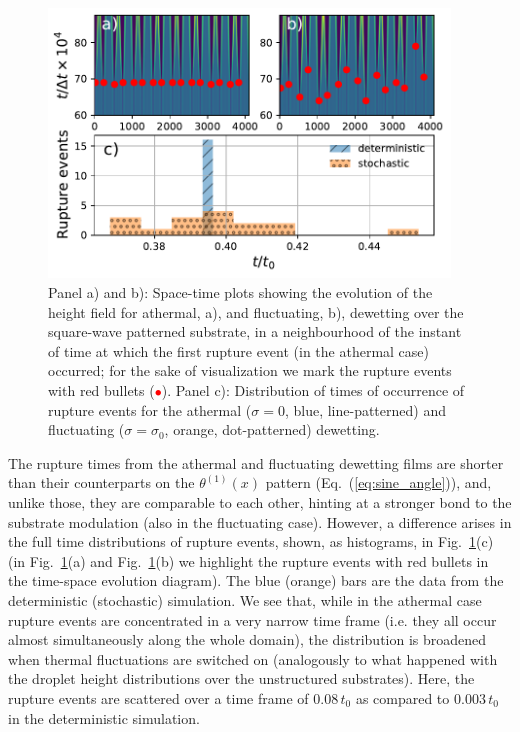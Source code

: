 \begin{figure}
    \centering
    \includegraphics[width=0.95\textwidth]{graphics/Rupture_events_with_film.pdf}
    \caption{Panel a) and b): Space-time plots showing the evolution of the height field for athermal, a), and fluctuating, b), dewetting over the square-wave patterned substrate, 
    in a neighbourhood of the instant of time at which the first rupture event (in the athermal case) occurred; for the sake of visualization we mark the rupture events with red bullets (\textcolor{red}{$\bullet$}).
    Panel c): Distribution of times of occurrence of rupture events for the athermal ($\sigma=0$, blue, line-patterned) and fluctuating ($\sigma = \sigma_0$, orange, dot-patterned) dewetting.} 
    \label{fig:rupture_time_distri_square_wave8}
\end{figure}
The rupture times from the athermal and fluctuating dewetting films are shorter than 
their counterparts on the $\theta^{(1)}(x)$ pattern (Eq.~(\ref{eq:sine_angle})), and, unlike those, they are comparable to each other, hinting at a stronger bond to the substrate modulation (also in the fluctuating case).
However, a difference arises in the full time distributions of rupture events, 
shown, as histograms, in
Fig.~\ref{fig:rupture_time_distri_square_wave8}(c) 
(in Fig.~\ref{fig:rupture_time_distri_square_wave8}(a) and 
Fig.~\ref{fig:rupture_time_distri_square_wave8}(b) we highlight the rupture events with red bullets in 
the time-space evolution diagram).
The blue (orange) bars are the data from the deterministic (stochastic) simulation.
We see that, while in the athermal case rupture events are concentrated in a very narrow time frame 
(i.e. they all occur almost simultaneously along the whole domain),
the distribution is broadened when thermal fluctuations are switched on 
(analogously to what happened with the droplet height distributions over the unstructured substrates).
Here, the rupture events are scattered over a time frame of $0.08\,t_0$ as compared to $0.003\,t_0$ 
in the deterministic simulation.

